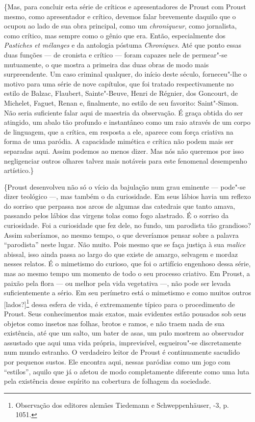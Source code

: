 \{Mas, para concluir esta série de críticos e apresentadores de Proust
com Proust mesmo, como apresentador e crítico, devemos falar brevemente
daquilo que o ocupou ao lado de sua obra principal, como um
\emph{chroniqueur}, como jornalista, como crítico, mas sempre como o
gênio que era. Então, especialmente dos \emph{Pastiches et mélanges} e
da antologia póstuma \emph{Chroniques}. Até que ponto essas duas
funções --- de cronista e crítico --- foram capazes nele de permear"-se
mutuamente, o que mostra a primeira das duas obras de modo mais
surpreendente. Um caso criminal qualquer, do início deste século,
forneceu"-lhe o motivo para uma série de nove capítulos, que foi
tratado respectivamente no estilo de Balzac, Flaubert, Sainte"-Beuve,
Henri de Régnier, dos Goncourt, de Michelet, Faguet, Renan e,
finalmente, no estilo de seu favorito: Saint"-Simon. Não seria suficiente
falar aqui de maestria da observação. É graça obtida do ser atingido, um
abalo tão profundo e instantâneo como um raio através de um corpo
de linguagem, que a crítica, em resposta a ele, aparece com força
criativa na forma de uma paródia. A capacidade mimética e crítica não
podem mais ser separadas aqui. Assim podemos ao menos dizer. Mas nós não
queremos por isso negligenciar outros olhares talvez mais notáveis para
este fenomenal desempenho artístico.\}

\{Proust desenvolveu não só o vício da bajulação num grau eminente ---
pode"-se dizer teológico ---, mas também o da curiosidade. Em seus lábios
havia um reflexo do sorriso que perpassa nos arcos de algumas das
catedrais que tanto amava, passando pelos lábios das virgens tolas como
fogo alastrado. É o sorriso da curiosidade. Foi a curiosidade que fez dele, no
fundo, um parodista tão grandioso? Assim saberíamos, ao mesmo
tempo, o que deveríamos pensar sobre a palavra ``parodista'' neste lugar.
Não muito. Pois mesmo que se faça justiça à sua \emph{malice} abissal,
isso ainda passa ao largo do que existe de amargo, selvagem e mordaz nesses relatos. É
o mimetismo do curioso, que foi o artifício engenhoso dessa série, mas ao mesmo tempo um momento de todo o seu processo
criativo. Em Proust, a paixão pela flora --- ou melhor pela vida vegetativa ---,
não pode ser levada suficientemente a sério. Em seu perímetro está o
mimetismo e como muitos outros {[}lados?{]}\footnote{Observação dos
  editores alemães Tiedemann e Schweppenhäuser, -3,
  p. 1051. \versal{[N. E.]}} dessa esfera de vida, é extremamente típico para o
procedimento de Proust. Seus conhecimentos mais exatos, mais evidentes
estão pousados sob seus objetos como insetos nas folhas, brotos e
ramos, e não traem nada de sua existência, até que um salto, um bater
de asas, um pulo mostrem ao observador assustado que aqui uma vida própria,
imprevisível, esgueirou"-se discretamente num mundo
estranho. O verdadeiro leitor de Proust é continuamente sacudido por
pequenos sustos. Ele encontra aqui, nessas paródias como um jogo com
``estilos'', aquilo que já o afetou de modo completamente diferente como
uma luta pela existência desse espírito na cobertura de folhagem da
sociedade.

